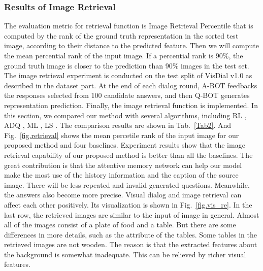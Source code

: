 \documentclass[review]{elsarticle}
\begin{document}
	\subsubsection{Results of Image Retrieval}
	The evaluation metric for retrieval function is Image Retrieval Percentile that is computed by the rank of the ground truth representation in the sorted test image, according to their distance to the predicted feature. 
	Then we will compute the mean percential rank of the input image. If a percential rank is $90\%$, the ground truth image is closer to the prediction than $90\%$ images in the test set.
	The image retrieval experiment is conducted on the test split of VisDial v1.0 as described in the dataset part. 
	At the end of each dialog round, A-BOT feedbacks the responses selected from 100 candidate answers, and then Q-BOT generates representation prediction. Finally, the image retrieval function is implemented. In this section, we compared our method with several algorithms, including RL \cite{DBLP:conf/iccv/DasKMLB17}, ADQ \cite{DBLP:conf/emnlp/MurahariCBPD19}, ML \cite{DBLP:conf/atal/AgarwalGSLS19}, LS \cite{DBLP:conf/iclr/LeeGYYH19}. 
	The comparison results are shown in Tab.~\ref{Tab2}. And Fig.~\ref{fig.retrieval} shows the mean percetile rank of the input image for our proposed method and four baselines. 
	Experiment results show that the image retrieval capability of our proposed method is better than all the baselines. The great contribution is that the attentive memory network can help our model make the most use of the history information and the caption of the source image. 
	There will be less repeated and invalid generated questions. Meanwhile, the answers also become more precise. Visual dialog and image retrieval can affect each other positively. 
	Its visualization is shown in Fig.~\ref{fig.vis_re}. In the last row, the retrieved images are similar to the input of image in general. Almost all of the images consist of a plate of food and a table. But there are some differences in more details, such as the attribute of the tables. Some tables in the retrieved images are not wooden. The reason is that the extracted features about the background is somewhat inadequate. This can be relieved by richer visual features.
	
\end{document}
